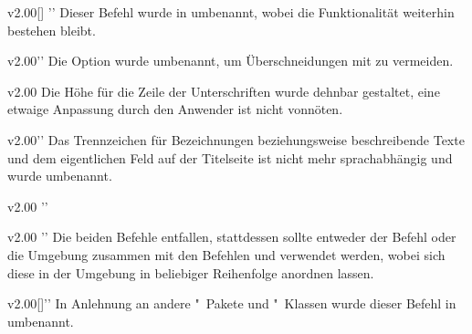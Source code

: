 \begin{Obsolete}{v2.00}{[]}%
  ''%
\printdeclarationlist%
%
Dieser Befehl wurde in  umbenannt, wobei die Funktionalität 
weiterhin bestehen bleibt.
\end{Obsolete}

\begin{Obsolete}{v2.00}{}''
\printdeclarationlist%
%
Die Option wurde umbenannt, um Überschneidungen mit  zu 
vermeiden.
\end{Obsolete}

\begin{Obsolete}{v2.00}{}
\printdeclarationlist%
%
Die Höhe für die Zeile der Unterschriften wurde dehnbar gestaltet, eine etwaige 
Anpassung durch den Anwender ist nicht vonnöten.
\end{Obsolete}

\begin{Obsolete}{v2.00}{}''
\printdeclarationlist%
%
Das Trennzeichen für Bezeichnungen beziehungsweise beschreibende Texte und dem 
eigentlichen Feld auf der Titelseite ist nicht mehr sprachabhängig und wurde 
umbenannt.
\end{Obsolete}

\begin{Obsolete}{v2.00}{}%
  ''
\begin{Obsolete}{v2.00}{}%
  ''
\printdeclarationlist%
%
Die beiden Befehle entfallen, stattdessen sollte entweder der Befehl 
 oder die Umgebung  zusammen mit 
den Befehlen  und  verwendet werden, 
wobei sich diese in der Umgebung in beliebiger Reihenfolge anordnen lassen.
\end{Obsolete}
\end{Obsolete}

\begin{Obsolete}{v2.00}{[]}''
\printdeclarationlist%
%
In Anlehnung an andere "~Pakete und "~Klassen wurde 
dieser Befehl in  umbenannt.
\end{Obsolete}

